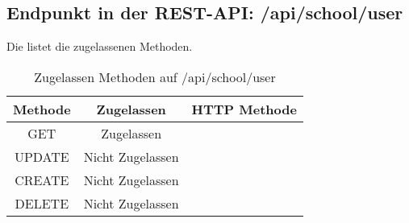 \subsection{Endpunkt in der REST-API: /api/school/user}
Die  listet die zugelassenen Methoden. 

\begin{table}[!htbp]
	\begin{tabular}{|c|c|c|}
		\hline
			\textbf{Methode} & \textbf{Zugelassen} & \textbf{HTTP Methode} \\ \hline
			GET & Zugelassen &  \\ \hline
			UPDATE & Nicht Zugelassen & \\ \hline 
			CREATE & Nicht Zugelassen & \\ \hline 
			DELETE & Nicht Zugelassen & \\ \hline
	\end{tabular}

		\caption{Zugelassen Methoden auf /api/school/user}
		\label{tab:end:rest:api:school:user:meth}
\end{table}